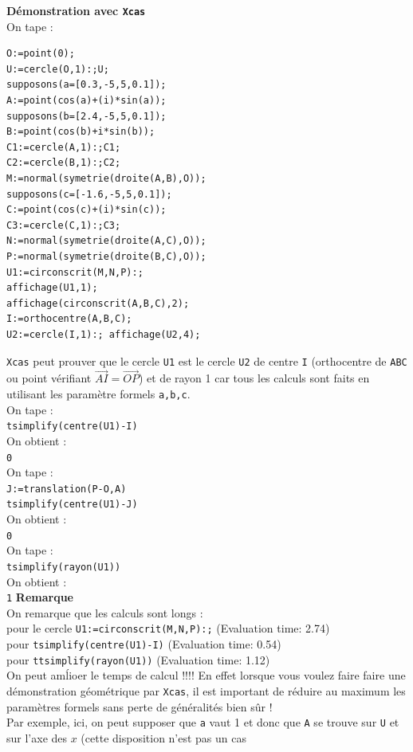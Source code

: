 \documentclass[a4paper,11pt]{book}
\begin{document}
{\bf D\'emonstration avec {\tt Xcas}}\\
On tape :
\begin{verbatim}
O:=point(0);
U:=cercle(O,1):;U;
supposons(a=[0.3,-5,5,0.1]);
A:=point(cos(a)+(i)*sin(a));
supposons(b=[2.4,-5,5,0.1]);
B:=point(cos(b)+i*sin(b));
C1:=cercle(A,1):;C1;
C2:=cercle(B,1):;C2;
M:=normal(symetrie(droite(A,B),O));
supposons(c=[-1.6,-5,5,0.1]);
C:=point(cos(c)+(i)*sin(c));
C3:=cercle(C,1):;C3;
N:=normal(symetrie(droite(A,C),O));
P:=normal(symetrie(droite(B,C),O));
U1:=circonscrit(M,N,P):;
affichage(U1,1);
affichage(circonscrit(A,B,C),2);
I:=orthocentre(A,B,C);
U2:=cercle(I,1):; affichage(U2,4);
\end{verbatim}
{\tt Xcas}  peut prouver que le cercle {\tt U1} est le cercle  {\tt U2} de 
centre {\tt I} (orthocentre de {\tt ABC} ou point v\'erifiant 
$\overrightarrow{AI}= \overrightarrow{OP}$) et de rayon 1 car tous les calculs 
sont faits en utilisant les param\`etre formels {\tt a,b,c}.\\
On tape :\\
{\tt tsimplify(centre(U1)-I)}\\
On obtient :\\
{\tt 0}\\
On tape :\\
{\tt J:=translation(P-O,A)}\\
{\tt tsimplify(centre(U1)-J)}\\
On obtient :\\
{\tt 0}\\
On tape :\\
{\tt tsimplify(rayon(U1))}\\
On obtient :\\
{\tt 1}
{\bf Remarque}\\
On remarque que les calculs sont longs :\\
pour le cercle {\tt U1:=circonscrit(M,N,P):;} (Evaluation time: 2.74)\\
pour {\tt tsimplify(centre(U1)-I)} (Evaluation time: 0.54)\\
pour {\tt ttsimplify(rayon(U1))} (Evaluation time: 1.12)\\
On peut am\'lioer le temps de calcul !!!!
En effet lorsque vous voulez faire faire une d\'emonstration g\'eom\'etrique 
par {\tt Xcas}, il est important de r\'eduire au maximum les param\`etres 
formels sans perte de g\'en\'eralit\'es bien s\^ur !\\
Par exemple, ici, on peut supposer que {\tt a} vaut 1 et donc que {\tt A} se 
trouve sur {\tt U} et sur l'axe des $x$ (cette disposition n'est pas un cas 
\end{document}
